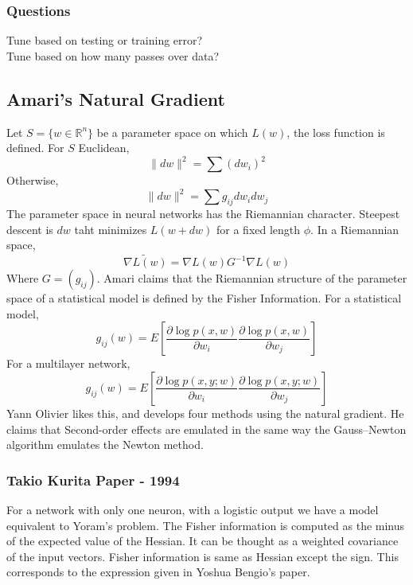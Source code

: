 \documentclass[12pt]{article}
\begin{document}
\subsubsection{Questions}

Tune based on testing or training error? \\
Tune based on how many passes over data? \\

\subsection{Amari's Natural Gradient}
Let $S = \{ w \in \mathbb{R}^n \}$ be a parameter space on which $L(w)$, the loss function is defined. For $S$ Euclidean, 
\begin{equation}
	\|dw\|^2 = \sum (dw_i)^2
\end{equation}
Otherwise,
\begin{equation}
	\|dw\|^2 = \sum g_{ij}dw_i dw_j
\end{equation}
The parameter space in neural networks has the Riemannian character.
Steepest descent is $dw$ taht minimizes $L(w+dw)$ for a fixed length $\phi$.
In a Riemannian space, 
\begin{equation}
	\tilde{\nabla L(w)} = \nabla L(w) G^{-1} \nabla L(w)
 \end{equation}
Where $G = (g_{ij})$. Amari claims that the Riemannian structure of the parameter space of a statistical model is defined by the Fisher Information. 
For a statistical model, 
\begin{equation}
	g_{ij}(w) = E \left[ \frac{\partial \log p(x,w)}{\partial w_i} \frac{\partial \log p(x,w)}{\partial w_j} \right]
\end{equation}
For a multilayer network, 
\begin{equation}
	g_{ij}(w) = E \left[ \frac{\partial \log p(x,y;w)}{\partial w_i} \frac{\partial \log p(x,y;w)}{\partial w_j} \right]
\end{equation}
Yann Olivier likes this, and develops four methods using the natural gradient. He claims that Second-order effects are emulated in the same way the Gauss–Newton algorithm emulates the Newton method.

\subsubsection{Takio Kurita Paper - 1994}
For a network with only one neuron, with a logistic output we have a model equivalent to Yoram's problem. The Fisher information is computed as the minus of the expected value of the Hessian. It can be thought as a weighted covariance of the input vectors. Fisher information is same as Hessian except the sign. This corresponds to the expression given in Yoshua Bengio's paper. 
\end{document}

